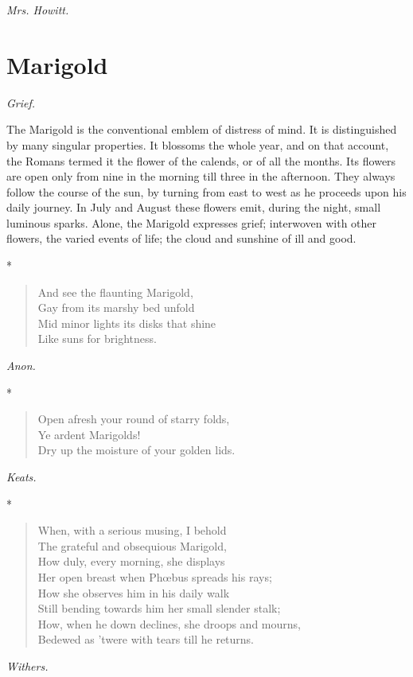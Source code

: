 \documentclass[11pt,twoside]{article}
\newcommand\flower[2]{\section*{#1}\addcontentsline{toc}{section}{#1}%
  \noindent\textit{#2.}\par\medskip}
\newcommand\stars{\begin{center}*\quad*\quad*\end{center}}
\newcommand\by[1]{\par\hfill\textit{#1}\par}
\begin{document}
\by{Mrs. Howitt.}

\flower{Marigold}{Grief}

The Marigold is the conventional emblem of distress of mind. It is distinguished by many singular properties. It blossoms the whole year, and on that account, the Romans termed it the flower of the calends, or of all the months. Its flowers are open only from nine in the morning till three in the afternoon. They always follow the course of the sun, by turning from east to west as he proceeds upon his daily journey. In July and August these flowers emit, during the night, small luminous sparks. Alone, the Marigold expresses grief; interwoven with other flowers, the varied events of life; the cloud and sunshine of ill and good.

\stars

\begin{verse}
And see the flaunting Marigold,\\
Gay from its marshy bed unfold\\
Mid minor lights its disks that shine\\
Like suns for brightness.
\end{verse}

\by{Anon.}

\stars

\begin{verse}
Open afresh your round of starry folds,\\
Ye ardent Marigolds!\\
Dry up the moisture of your golden lids.
\end{verse}

\by{Keats.}

\stars

\begin{verse}
When, with a serious musing, I behold\\
The grateful and obsequious Marigold,\\
How duly, every morning, she displays\\
Her open breast when Phœbus spreads his rays;\\
How she observes him in his daily walk\\
Still bending towards him her small slender stalk;\\
How, when he down declines, she droops and mourns,\\
Bedewed as ’twere with tears till he returns.
\end{verse}

\by{Withers.}
\end{document}
